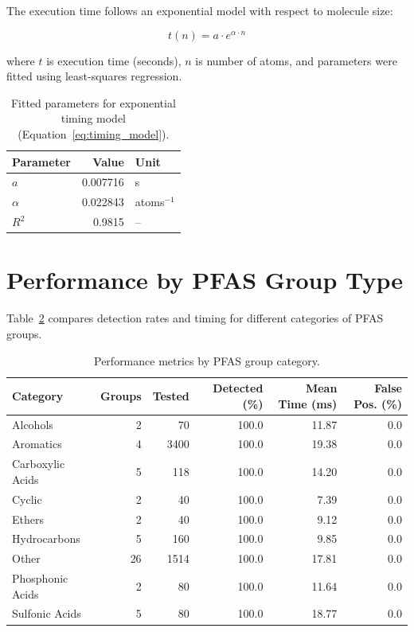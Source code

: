 The execution time follows an exponential model with respect to molecule size:

\begin{equation}
t(n) = a \cdot e^{\alpha \cdot n}
\label{eq:timing_model}
\end{equation}

where $t$ is execution time (seconds), $n$ is number of atoms, and parameters were fitted using least-squares regression.

\begin{table}[htbp]
\centering
\caption{Fitted parameters for exponential timing model (Equation~\ref{eq:timing_model}).}
\label{tab:timing_model}
\begin{tabular}{lrl}
\toprule
\textbf{Parameter} & \textbf{Value} & \textbf{Unit} \\
\midrule
$a$ & 0.007716 & s \\
$\alpha$ & 0.022843 & atoms$^{-1}$ \\
$R^2$ & 0.9815 & -- \\
\bottomrule
\end{tabular}
\end{table}

\section*{Performance by PFAS Group Type}

Table~\ref{tab:group_type_performance} compares detection rates and timing for different categories of PFAS groups.

\begin{table}[htbp]
\centering
\caption{Performance metrics by PFAS group category.}
\label{tab:group_type_performance}
\begin{tabular}{lrrrrr}
\toprule
\textbf{Category} & \textbf{Groups} & \textbf{Tested} & \textbf{Detected (\%)} & \textbf{Mean Time (ms)} & \textbf{False Pos. (\%)} \\
\midrule
Alcohols & 2 & 70 & 100.0 & 11.87 & 0.0 \\
Aromatics & 4 & 3400 & 100.0 & 19.38 & 0.0 \\
Carboxylic Acids & 5 & 118 & 100.0 & 14.20 & 0.0 \\
Cyclic & 2 & 40 & 100.0 & 7.39 & 0.0 \\
Ethers & 2 & 40 & 100.0 & 9.12 & 0.0 \\
Hydrocarbons & 5 & 160 & 100.0 & 9.85 & 0.0 \\
Other & 26 & 1514 & 100.0 & 17.81 & 0.0 \\
Phosphonic Acids & 2 & 80 & 100.0 & 11.64 & 0.0 \\
Sulfonic Acids & 5 & 80 & 100.0 & 18.77 & 0.0 \\
\bottomrule
\end{tabular}
\end{table}

